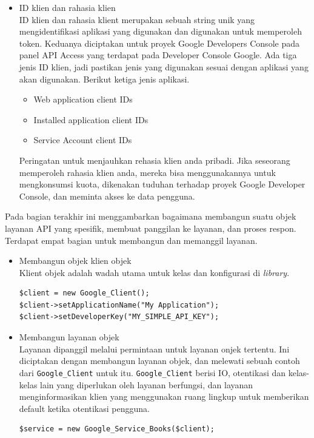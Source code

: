 \begin{itemize}
\begin{itemize}
\item ID klien dan rahasia klien\\
ID klien dan rahasia klient merupakan sebuah string unik yang mengidentifikasi aplikasi yang digunakan dan digunakan untuk memperoleh token. Keduanya diciptakan untuk proyek Google Developers Console pada panel API Access yang terdapat pada Developer Console Google. Ada tiga jenis ID klien, jadi pastikan jenis yang digunakan sesuai dengan aplikasi yang akan digunakan. Berikut ketiga  jenis aplikasi.
\begin{itemize}
\item Web application client IDs
\item Installed application client IDs
\item Service Account client IDs
\end{itemize}
Peringatan untuk menjauhkan rehasia klien anda pribadi. Jika seseorang memperoleh rahasia klien anda, mereka bisa menggunakannya untuk mengkonsumsi kuota, dikenakan tuduhan terhadap proyek Google Developer Console, dan meminta akses ke data pengguna.
\end{itemize}

Pada bagian terakhir ini menggambarkan bagaimana membangun suatu objek layanan API yang spesifik, membuat panggilan ke layanan, dan proses respon. Terdapat empat bagian untuk membangun dan memanggil layanan.

\begin{itemize}
\item Membangun objek klien objek\\
Klient objek adalah wadah utama untuk kelas dan konfigurasi di {\it library}.
\begin{verbatim}
$client = new Google_Client();
$client->setApplicationName("My Application");
$client->setDeveloperKey("MY_SIMPLE_API_KEY");
\end{verbatim}

\item Membangun layanan objek\\
Layanan dipanggil melalui permintaan untuk layanan onjek tertentu. Ini diciptakan dengan membangun layanan objek, dan melewati sebuah contoh dari \verb+Google_Client+ untuk itu. \verb+Google_Client+ berisi IO, otentikasi dan kelas-kelas lain yang diperlukan oleh layanan berfungsi, dan layanan menginformasikan klien yang menggunakan ruang lingkup untuk memberikan default ketika otentikasi pengguna.
\begin{verbatim}
$service = new Google_Service_Books($client);
\end{verbatim}


\end{itemize}
\end{itemize}
